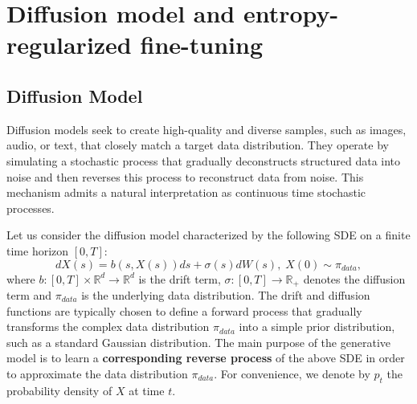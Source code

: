 \documentclass[11pt]{article}
\begin{document}
\section{Diffusion model and entropy-regularized fine-tuning}
\subsection{Diffusion Model}
%
%
Diffusion models seek to create high-quality and diverse samples, such as images, audio, or text, that closely match a target data distribution. They operate by simulating a stochastic process that gradually deconstructs structured data into noise and then reverses this process to reconstruct data from noise. This mechanism admits a natural interpretation as continuous time stochastic processes. 

Let us consider the diffusion model characterized by the following SDE on a finite time horizon $[0,T]$:
\begin{equation}
\label{f:SDE}
dX(s) = b(s,X(s))ds + \sigma(s) dW(s),\; X(0) \sim \pi_{data}, 
\end{equation}
where $b: [0,T]\times \mathbb{R}^d \rightarrow \mathbb{R}^d$ is the drift term, $\sigma: [0,T]\rightarrow \mathbb{R}_{+} $ denotes the diffusion term and $\pi_{data}$ is the underlying data distribution. The drift and diffusion functions are typically chosen to define a forward process that gradually transforms the complex data distribution $ \pi_{data}$ into a simple prior distribution, such as a standard Gaussian distribution. The main purpose of the generative model is to learn a \textbf{corresponding reverse process} of the above SDE in order to approximate the data distribution $ \pi_{data}$. For convenience, we denote by $p_t$ the probability density of $X$ at time $t$.
\end{document}
